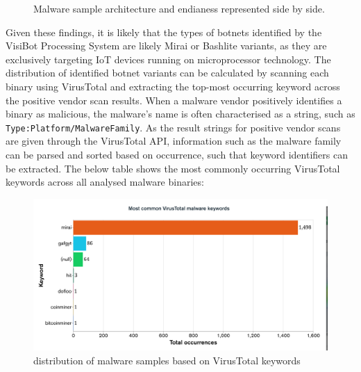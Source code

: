 \begin{figure}[!htb]
    \centering
    \qquad
    \caption{Malware sample architecture and endianess represented side by side.}
    \label{fig:arch_vs_endianess}
\end{figure}

Given these findings, it is likely that the types of botnets identified by the VisiBot Processing System are likely Mirai or Bashlite variants, as they are exclusively targeting IoT devices running on microprocessor technology. The distribution of identified botnet variants can be calculated by scanning each binary using VirusTotal and extracting the top-most occurring keyword across the positive vendor scan results. When a malware vendor positively identifies a binary as malicious, the malware's name is often characterised as a string, such as \texttt{Type:Platform/MalwareFamily}. As the result strings for positive vendor scans are given through the VirusTotal API, information such as the malware family can be parsed and sorted based on occurrence, such that keyword identifiers can be extracted. The below table shows the most commonly occurring VirusTotal keywords across all analysed malware binaries:

\begin{figure}[!htb]
    \centering
    \includegraphics[width=0.75\linewidth]{results/vt_keywords.png}
    \caption{distribution of malware samples based on VirusTotal keywords}
    \label{fig:vt_keywords} 
\end{figure}

